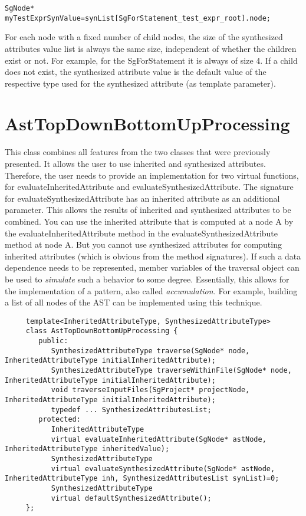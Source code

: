 {\indent
{\mySmallFontSize
\begin{verbatim}
SgNode* myTestExprSynValue=synList[SgForStatement_test_expr_root].node;
\end{verbatim}
}}
For each node with a fixed number of child nodes, the size of the synthesized
attributes value list is always the same size, independent of whether the children
exist or not. For example, for the SgForStatement it is always of size 4. If a child
does not exist, the synthesized attribute value is the default value of the respective
type used for the synthesized attribute (as template parameter).

\section{AstTopDownBottomUpProcessing}
\label{AstProcessing:AstTopDownBottomUpProcessing}

This class combines all features from the two classes that were previously presented.  It
allows the user to use inherited and synthesized attributes. Therefore, the user needs
to provide an implementation for two virtual functions, for
evaluateInheritedAttribute and evaluateSynthesizedAttribute. The
signature for evaluateSynthesizedAttribute has an inherited attribute
as an additional parameter. This allows the results of
inherited and synthesized attributes to be combined. You can use the
inherited attribute that is computed at a
node A by the evaluateInheritedAttribute method in the evaluateSynthesizedAttribute method at node A. But you cannot
use synthesized attributes for computing inherited attributes (which is obvious from the method signatures). If such a data
dependence needs to be represented, member variables of the traversal
object can be used to {\em simulate} such a behavior to some
degree. Essentially, this allows for the implementation of a pattern, also called
{\em accumulation.} For example, building a list of all nodes of the AST
can be implemented using this technique.

{\indent
{\mySmallFontSize
\begin{verbatim}
     template<InheritedAttributeType, SynthesizedAttributeType>
     class AstTopDownBottomUpProcessing {
        public:
           SynthesizedAttributeType traverse(SgNode* node, InheritedAttributeType initialInheritedAttribute);
           SynthesizedAttributeType traverseWithinFile(SgNode* node, InheritedAttributeType initialInheritedAttribute);
           void traverseInputFiles(SgProject* projectNode, InheritedAttributeType initialInheritedAttribute);
           typedef ... SynthesizedAttributesList;
        protected:
           InheritedAttributeType
           virtual evaluateInheritedAttribute(SgNode* astNode, InheritedAttributeType inheritedValue);
           SynthesizedAttributeType
           virtual evaluateSynthesizedAttribute(SgNode* astNode, InheritedAttributeType inh, SynthesizedAttributesList synList)=0;
           SynthesizedAttributeType
           virtual defaultSynthesizedAttribute();
     };
\end{verbatim}
}}

